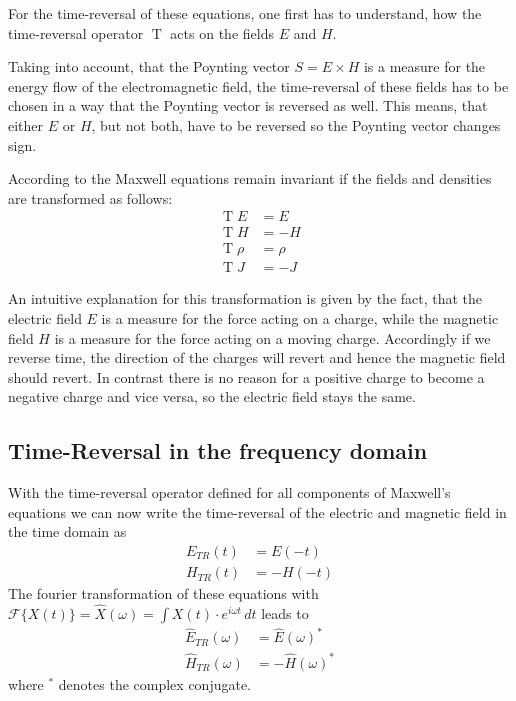 For the time-reversal of these equations, one first has to understand, how the time-reversal operator \(\operatorname{T}\) acts on the fields \(E\) and \(H\).

Taking into account, that the Poynting vector \(S = E \times H\) is a measure for the energy flow of the electromagnetic field, the time-reversal of these fields has to be chosen in a way that the Poynting vector is reversed as well.
This means, that either \(E\) or \(H\), but not both, have to be reversed so the Poynting vector changes sign. 

According to \parencite{sigwarth_time_2022} the Maxwell equations remain invariant if the fields and densities are transformed as follows:
\begin{align}
    \operatorname{T}E &= E \\
    \operatorname{T}H &= -H \\
    \operatorname{T}\rho &= \rho \\
    \operatorname{T}{J} &= -{J}
\end{align}

An intuitive explanation for this transformation is given by the fact, that the electric field \(E\) is a measure for the force acting on a charge, while the magnetic field \(H\) is a measure for the force acting on a moving charge. 
Accordingly if we reverse time, the direction of the charges will revert and hence the magnetic field should revert. 
In contrast there is no reason for a positive charge to become a negative charge and vice versa, so the electric field stays the same.



\subsection{Time-Reversal in the frequency domain}
With the time-reversal operator defined for all components of Maxwell's equations we can now write the time-reversal of the electric and magnetic field in the time domain as
\begin{align}
    E_{TR}(t) &= E(-t) \\
    H_{TR}(t) &= -H(-t)
\end{align}
The fourier transformation of these equations with \(\mathcal{F}\{X(t)\} = \hat{X}(\omega) = \int X(t) \cdot e^{i\omega t} \, dt\) leads to
\begin{align}
    \hat{E}_{TR}(\omega) &= \hat{E}{(\omega)}^* \\
    \hat{H}_{TR}(\omega) &= -\hat{H}{(\omega)}^*
\end{align}
where \(^*\) denotes the complex conjugate. 

